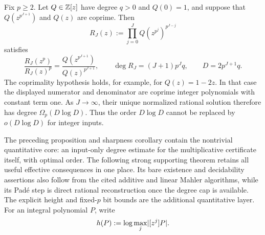 \begin{corollary}
\label{rem:logarithmic-mahler-degree-sharpness}
Fix \(p\ge2\).  Let \(Q\in\mathbb{Z}[z]\) have degree \(q>0\) and \(Q(0)=1\),
and suppose that
\(Q(z^{p^{J+1}})\) and \(Q(z)\) are coprime.  Then
\[
 R_J(z):=\prod_{j=0}^{J}Q(z^{p^j})^{p^{J-j}}
\]
satisfies
\[
 \frac{R_J(z^p)}{R_J(z)^p}
 =\frac{Q(z^{p^{J+1}})}{Q(z)^{p^{J+1}}},
 \qquad
 \deg R_J=(J+1)p^Jq,\qquad D=2p^{J+1}q.
\]
The coprimality hypothesis holds, for example, for \(Q(z)=1-2z\).  In that
case the displayed numerator and denominator are coprime integer polynomials
with constant term one.  As \(J\to\infty\), their unique normalized rational
solution therefore has degree \(\Omega_p(D\log D)\).  Thus the order
\(D\log D\) cannot be replaced by \(o(D\log D)\) for integer inputs.
\end{corollary}

The preceding proposition and sharpness corollary contain the nontrivial
quantitative core: an input-only degree estimate for the multiplicative
certificate itself, with optimal order.  The following strong supporting
theorem retains all useful effective consequences in one place.  Its bare
existence and decidability assertions also follow from the cited additive and
linear Mahler algorithms, while its Pad\'e step is direct rational
reconstruction once the degree cap is available.  The explicit height and
fixed-\(p\) bit bounds are the additional quantitative layer.  For an integral
polynomial \(P\), write
\[
 h(P):=\log\max_j\lvert [z^j]P \rvert.
\]
